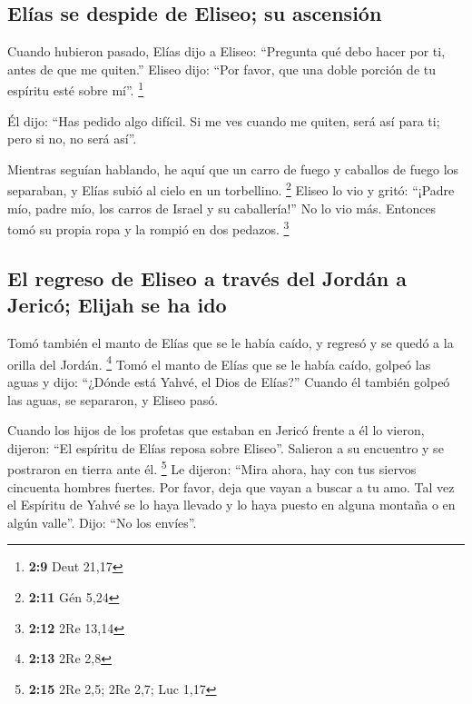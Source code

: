 \hypertarget{eluxedas-se-despide-de-eliseo-su-ascensiuxf3n}{%
\subsection{Elías se despide de Eliseo; su
ascensión}\label{eluxedas-se-despide-de-eliseo-su-ascensiuxf3n}}

 Cuando hubieron pasado, Elías dijo a Eliseo: ``Pregunta
qué debo hacer por ti, antes de que me quiten.'' Eliseo dijo: ``Por
favor, que una doble porción de tu espíritu esté sobre mí''. \footnote{\textbf{2:9}
  Deut 21,17}

 Él dijo: ``Has pedido algo difícil. Si me ves cuando me
quiten, será así para ti; pero si no, no será así''.

 Mientras seguían hablando, he aquí que un carro de fuego
y caballos de fuego los separaban, y Elías subió al cielo en un
torbellino. \footnote{\textbf{2:11} Gén 5,24}  Eliseo lo
vio y gritó: ``¡Padre mío, padre mío, los carros de Israel y su
caballería!'' No lo vio más. Entonces tomó su propia ropa y la rompió en
dos pedazos. \footnote{\textbf{2:12} 2Re 13,14}

\hypertarget{el-regreso-de-eliseo-a-travuxe9s-del-jorduxe1n-a-jericuxf3-elijah-se-ha-ido}{%
\subsection{El regreso de Eliseo a través del Jordán a Jericó; Elijah se
ha
ido}\label{el-regreso-de-eliseo-a-travuxe9s-del-jorduxe1n-a-jericuxf3-elijah-se-ha-ido}}

 Tomó también el manto de Elías que se le había caído, y
regresó y se quedó a la orilla del Jordán. \footnote{\textbf{2:13} 2Re
  2,8}  Tomó el manto de Elías que se le había caído,
golpeó las aguas y dijo: ``¿Dónde está Yahvé, el Dios de Elías?'' Cuando
él también golpeó las aguas, se separaron, y Eliseo pasó.

 Cuando los hijos de los profetas que estaban en Jericó
frente a él lo vieron, dijeron: ``El espíritu de Elías reposa sobre
Eliseo''. Salieron a su encuentro y se postraron en tierra ante él.
\footnote{\textbf{2:15} 2Re 2,5; 2Re 2,7; Luc 1,17}  Le
dijeron: ``Mira ahora, hay con tus siervos cincuenta hombres fuertes.
Por favor, deja que vayan a buscar a tu amo. Tal vez el Espíritu de
Yahvé se lo haya llevado y lo haya puesto en alguna montaña o en algún
valle''. Dijo: ``No los envíes''.

